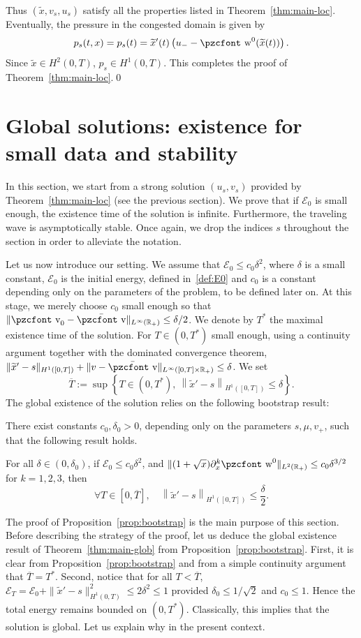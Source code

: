 \documentclass[10pt]{amsart}
\theoremstyle{definition}\newtheorem{defi}[theo]{Definition}\newtheorem{rema}[theo]{Remark}\newtheorem{exam}[theo]{Example}\newtheorem{exem}[theo]{Example}\newtheorem{nota}[theo]{Notation}
\newcommand{\mathpzc}[1]{\text{\pzcfont #1}}
\newcommand{\R}{\mathbb{R}}
\newcommand{\p}{\partial}
\newcommand{\bv}{\bar{\mathpzc{v}}}
\newcommand{\cE}{\mathcal E}
\newcommand{\tv}{\mathpzc{v}}
\newcommand{\tw}{\mathpzc{w}}
\newcommand{\tx}{\widetilde{x}}
\let\oldforall\forall
\renewcommand*{\forall}{\mathrel{\oldforall}}
\begin{document}
Thus $(\tx, v_s, u_s) $ satisfy all the properties listed in Theorem~\ref{thm:main-loc}. Eventually, the pressure in the congested domain is given by
\[
p_s(t,x)=p_s(t)=\tx'(t) \left(u_- - \tw^0(\tx(t))\right).
\]
Since $\tx\in H^2(0,T)$, $p_s\in H^1(0,T)$. This completes the proof of Theorem~\ref{thm:main-loc}.\qed


\section{Global solutions: existence for small data and stability} \label{sec:global}

In this section, we start from a strong solution $(u_s,v_s)$ provided by Theorem~\ref{thm:main-loc} (see the previous section). We prove that if $\cE_0$ is small enough, the existence time of the solution is infinite. Furthermore, the traveling wave is asymptotically stable. Once again, we drop the indices $s$ throughout the section in order to alleviate the notation.

Let us now introduce our setting. We assume that $\cE_0\leq c_0\delta^2$, where $\delta$ is a small constant, $\cE_0$ is the initial energy, defined in~\eqref{def:E0} and $c_0$ is a constant depending only on the parameters of the problem, to be defined later on. At this stage, we merely choose $c_0$ small enough so that $\|\tv_0-\bv\|_{L^\infty(\R_+)}\leq \delta/2$. We denote by $T^*$ the maximal existence time of the solution. For $T\in (0, T^*)$ small enough, using a continuity argument together with the dominated convergence theorem, $\| \tx'-s\|_{H^1([0,T])} + \|v -\bv\|_{L^\infty([0,T] \times \R_+)} \leq \delta$. We set
\[
\overline{T}:=\sup\left\{T\in (0, T^*), \ \left\|\tx'-s\right\|_{H^1([0,T])}\leq \delta\right\}.
\]
The global existence of the solution relies on the following bootstrap result:
\begin{prop}\label{prop:bootstrap}
There exist constants $c_0,\delta_0>0$, depending only on the parameters $s,\mu, v_+$, such that the following result holds.

For all $\delta\in (0, \delta_0)$, if $\cE_0\leq c_0\delta^2$, and $\|(1+\sqrt{x}) \p_x^k \tw^0\|_{L^2(\R_+)} \leq c_0 \delta^{3/2}$ for $k=1,2,3$, then
\[
\forall T\in [0, \overline{T}],\quad \left\|\tx'-s\right\|_{H^1([0,T])}\leq\frac{\delta}{2}.
\]
\end{prop}

The proof of Proposition~\ref{prop:bootstrap} is the main purpose of this section. Before describing the strategy of the proof, let us deduce the global existence result of Theorem~\ref{thm:main-glob} from Proposition~\ref{prop:bootstrap}. First, it is clear from Proposition~\ref{prop:bootstrap} and from a simple continuity argument that $\overline{T}=T^*$. Second, notice that for all $T< \overline{T}$, $\cE_T=\cE_0 + \|\tx'-s\|_{H^1(0,T)}^2 \leq 2 \delta^2 \leq 1$ provided $\delta_0\leq 1/\sqrt{2}$ and $c_0\leq 1$. Hence the total energy remains bounded on $(0, T^*)$. Classically, this implies that the solution is global. Let us explain why in the present context.
\end{document}
